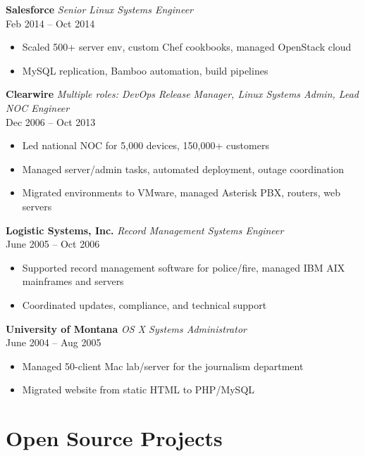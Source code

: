 \documentclass[11pt,a4paper]{article}
\begin{document}
\textbf{Salesforce} \hfill \emph{Senior Linux Systems Engineer}\\
Feb 2014 -- Oct 2014\\
\begin{itemize}[leftmargin=1.2em]
    \item Scaled 500+ server env, custom Chef cookbooks, managed OpenStack cloud
    \item MySQL replication, Bamboo automation, build pipelines
\end{itemize}

\textbf{Clearwire} \hfill \emph{Multiple roles: DevOps Release Manager, Linux Systems Admin, Lead NOC Engineer}\\
Dec 2006 -- Oct 2013\\
\begin{itemize}[leftmargin=1.2em]
    \item Led national NOC for 5,000 devices, 150,000+ customers
    \item Managed server/admin tasks, automated deployment, outage coordination
    \item Migrated environments to VMware, managed Asterisk PBX, routers, web servers
\end{itemize}

\textbf{Logistic Systems, Inc.} \hfill \emph{Record Management Systems Engineer}\\
June 2005 -- Oct 2006\\
\begin{itemize}[leftmargin=1.2em]
    \item Supported record management software for police/fire, managed IBM AIX mainframes and servers
    \item Coordinated updates, compliance, and technical support
\end{itemize}

\textbf{University of Montana} \hfill \emph{OS X Systems Administrator}\\
June 2004 -- Aug 2005\\
\begin{itemize}[leftmargin=1.2em]
    \item Managed 50-client Mac lab/server for the journalism department
    \item Migrated website from static HTML to PHP/MySQL
\end{itemize}

\section*{Open Source Projects}
\end{document}
